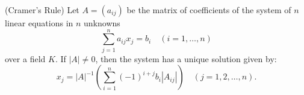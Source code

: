 (Cramer's Rule) Let $A = (a_{ij})$ be the matrix of coefficients of the system of $n$ linear equations in $n$ unknowns
\[
\sum_{j=1}^{n} a_{ij} x_j = b_i \quad (i = 1, \ldots, n)
\]
over a field $K$. If $|A| \neq 0$, then the system has a unique solution given by:
\[
x_j = |A|^{-1} \left( \sum_{i=1}^{n} (-1)^{i+j} b_i |A_{ij}| \right) \quad (j = 1, 2, \ldots, n).
\]

